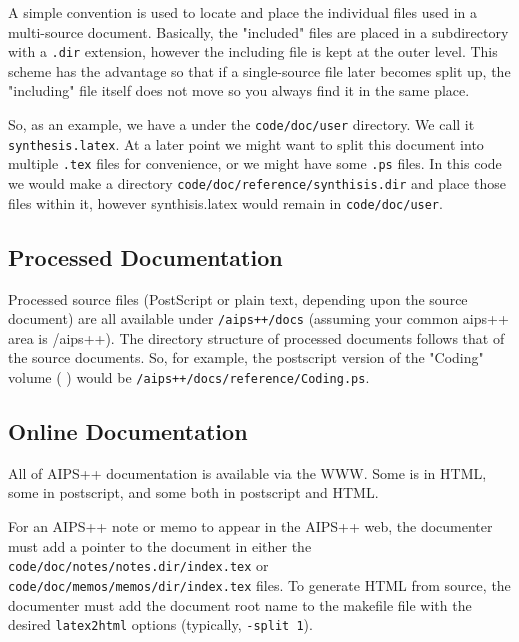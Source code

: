 A simple convention is used to locate and place the individual files
used in a multi-source document. Basically, the "included" files are
placed in a subdirectory with a \texttt{.dir} extension, however the
including file is kept at the outer level. This scheme has the advantage
so that if a single-source file later becomes split up, the "including" file
itself does not move so you always find it in the same place.

So, as an example, we have a \textbf{}
under the
\texttt{code/doc/user} directory. We call it
\texttt{synthesis.latex}.
At a later point we might want to split this document into
multiple \texttt{.tex} files for convenience, or we might have some
\texttt{.ps} files. In this code we would make a directory
\texttt{code/doc/reference/synthisis.dir} and place those files within it,
however synthisis.latex would remain in \texttt{code/doc/user}.

\label{Processed Documentation}
\subsection{Processed Documentation}

Processed source files (PostScript or plain text, depending upon the
source document) are all available under \texttt{/aips++/docs} (assuming
your common aips++ area is /aips++). The directory structure of
processed documents follows that of the source documents.  So, for
example, the postscript version of the "Coding" volume (\textbf{
})
would be \texttt{/aips++/docs/reference/Coding.ps}.

\label{Online Documentation}
\subsection{Online Documentation}

All of AIPS++ documentation is available via the WWW.  Some is in HTML,
some in postscript, and some both in postscript and HTML.  

For an AIPS++ note or memo to appear in the AIPS++ web, the documenter must
add a pointer to the document in either 
the \texttt{code/doc/notes/notes.dir/index.tex} or
\texttt{code/doc/memos/memos/dir/index.tex} files.  To generate HTML from
\latex source, the documenter must add the document root name to the makefile
file with the desired \texttt{latex2html} options (typically, \texttt{-split 1}).

